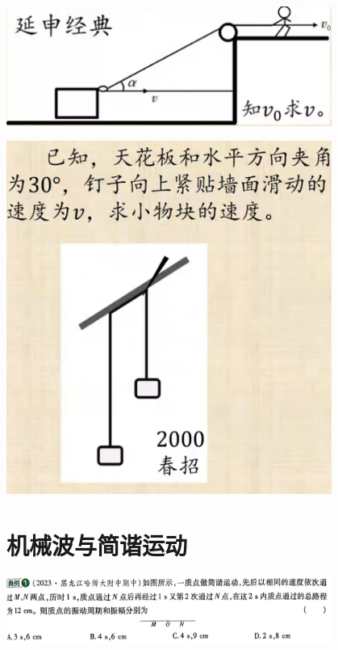 \documentclass{article}
\begin{document}
\vspace{5em}

\includegraphics[width = 0.8\textwidth]{./pictures/14.png}

\vspace{5em}

\includegraphics[width = 0.8\textwidth]{./pictures/15.png}

\vspace{5em}

\section{机械波与简谐运动}
\includegraphics[width = 0.8\textwidth]{./pictures/16.png}

\vspace{5em}
\end{document}
